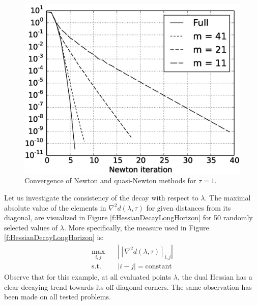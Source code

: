 \begin{figure}[h]
\centering
\includegraphics[scale=0.4]{./Figures/ConvergenceLongHorizon.eps}
\caption{Convergence of Newton and quasi-Newton methods for $\tau=1$.}
\label{f:ConvergenceLongHorizon}
\end{figure}

Let us investigate the consistency of the decay with respect to $\lambda$. The maximal absolute value of the elements in $\nabla^2 d(\lambda, \tau)$ for given distances from its diagonal, are visualized in Figure \ref{f:HessianDecayLongHorizon} for 50 randomly selected values of $\lambda$. More specifically, the measure used in Figure \ref{f:HessianDecayLongHorizon} is:
\begin{equation}
\begin{aligned}
\max_{i,j} & \quad | [\nabla^2 d(\lambda,\tau)]_{i,j} | \\
\text{s.t.} & \quad |i - j| = \text{constant}
\end{aligned}
\end{equation}
Observe that for this example, at all evaluated points $\lambda$, the dual Hessian has a clear decaying trend towards its off-diagonal corners. The same observation has been made on all tested problems.

